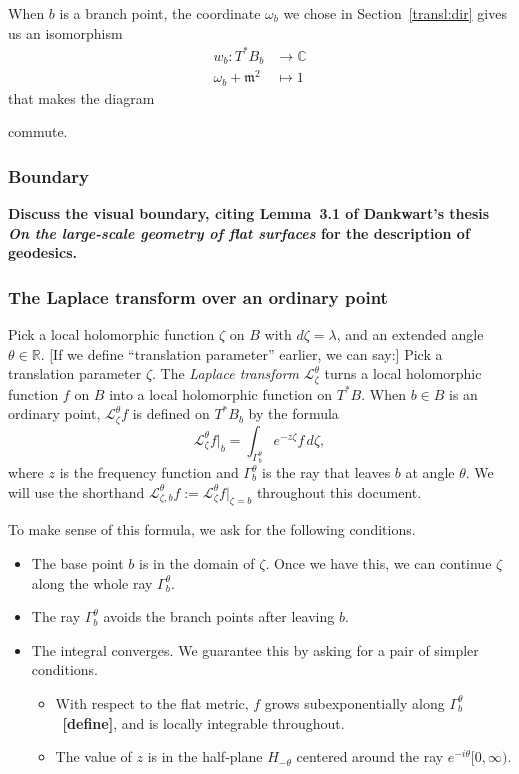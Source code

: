 \documentclass{article}
\theoremstyle{definition}
\newcommand{\maps}{\colon}
\newcommand{\R}{\mathbb{R}}
\newcommand{\C}{\mathbb{C}}
\newcommand{\blankbox}{{\fboxsep 0pt \colorbox{lightgray}{\phantom{$h$}}}}
\newcommand{\van}{\mathfrak{m}}
\newcommand{\laplace}{\mathcal{L}}
\begin{document}
When $b$ is a branch point, the coordinate $\omega_b$ we chose in Section~\ref{transl:dir} gives us an isomorphism
\begin{align*}
w_b \maps T^*B_b & \to \C \\
\omega_b + \van^2 & \mapsto 1
\end{align*}
that makes the diagram
\begin{center}
\end{center}
commute.
\subsubsection{Boundary}
\textbf{Discuss the visual boundary, citing Lemma~3.1 of Dankwart's thesis \textit{On the large-scale geometry of flat surfaces} for the description of geodesics.}

\subsubsection{The Laplace transform over an ordinary point}%
Pick a local holomorphic function $\zeta$ on $B$ with $d\zeta = \lambda$, and an extended angle $\theta \in \R$. \textcolor{VioletRed}{[If we define ``translation parameter'' earlier, we can say:] Pick a translation parameter $\zeta$.} The {\em Laplace transform} $\laplace_\zeta^\theta$ turns a local holomorphic function $f$ on $B$ into a local holomorphic function on $T^*B$. When $b \in B$ is an ordinary point, $\laplace_\zeta^\theta f$ is defined on $T^*B_b$ by the formula
\begin{equation}\label{laplace:int}
\laplace_\zeta^\theta f\big|_b = \int_{\Gamma_b^\theta} e^{-z\zeta} f\,d\zeta,
\end{equation}
where $z$ is the frequency function and $\Gamma_b^\theta$ is the ray that leaves $b$ at angle $\theta$. We will use the shorthand $\laplace_{\zeta, b}^\theta f := \laplace_\zeta^\theta f \big|_{\zeta = b}$ throughout this document.

To make sense of this formula, we ask for the following conditions.
\begin{itemize}
\item The base point $b$ is in the domain of $\zeta$. Once we have this, we can continue $\zeta$ along the whole ray $\Gamma_b^\theta$.
\item The ray $\Gamma_b^\theta$ avoids the branch points after leaving $b$.
\item The integral converges. We guarantee this by asking for a pair of simpler conditions.
\begin{itemize}
\item With respect to the flat metric, $f$ grows subexponentially along $\Gamma_b^\theta$~\textbf{[define]}, and is locally integrable throughout.
\item The value of $z$ is in the half-plane $H_{-\theta}$ centered around the ray $e^{-i\theta} [0, \infty)$.
\end{itemize}
\end{itemize}
\end{document}
